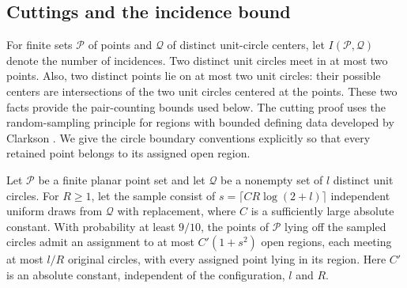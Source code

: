 \subsection{Cuttings and the incidence bound}

For finite sets \(\mathcal P\) of points and \(\mathcal Q\) of distinct
unit-circle centers, let \(I(\mathcal P,\mathcal Q)\) denote the number
of incidences. Two distinct unit circles meet in at most two points.
Also, two distinct points lie on at most two unit circles: their possible
centers are intersections of the two unit circles centered at the points.
These two facts provide the pair-counting bounds used below.
The cutting proof uses the random-sampling principle for regions with
bounded defining data developed by Clarkson \cite[Section~4]{Clarkson1987}.
We give the circle boundary conventions explicitly so that every retained
point belongs to its assigned open region.

\begin{lemma}\label{inc:cutting}
Let \(\mathcal P\) be a finite planar point set and let \(\mathcal Q\)
be a nonempty set of \(l\) distinct unit circles. For \(R\ge1\), let
the sample consist of \(s=\lceil C R\log(2+l)\rceil\) independent
uniform draws from \(\mathcal Q\) with replacement, where \(C\) is a
sufficiently large absolute constant. With probability at least \(9/10\),
the points of \(\mathcal P\) lying off the sampled circles admit an
assignment to at most \(C'(1+s^2)\) open regions, each meeting at most
\(l/R\) original circles, with every assigned point lying in its region.
Here \(C'\) is an absolute constant, independent of the configuration,
\(l\) and \(R\).
\end{lemma}

